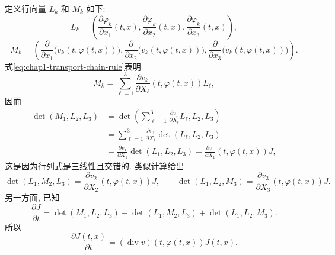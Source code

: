 \begin{Proof}
定义行向量 $L_k$ 和 $M_k$ 如下:
\[
  L_k=\left(
  \frac{\partial\varphi_k}{\partial x_1}(t,x),
  \frac{\partial\varphi_k}{\partial x_2}(t,x),
  \frac{\partial\varphi_k}{\partial x_3}(t,x)
  \right),
\]
\[
  M_k=\left(
  \frac{\partial}{\partial x_1}\bigl(v_k(t,\varphi(t,x))\bigr),
  \frac{\partial}{\partial x_2}\bigl(v_k(t,\varphi(t,x))\bigr),
  \frac{\partial}{\partial x_3}\bigl(v_k(t,\varphi(t,x))\bigr)
  \right).
\]
式\eqref{eq:chap1-transport-chain-rule}表明
\[
  M_k=\sum_{\ell=1}^{3}\frac{\partial v_k}{\partial X_\ell}(t,\varphi(t,x))L_\ell,
\]
因而
\begin{align*}
  \det(M_1,L_2,L_3)
  &=\det\left(\sum_{\ell=1}^{3}\frac{\partial v_1}{\partial X_\ell}L_\ell,L_2,L_3\right)\\
  &=\sum_{\ell=1}^{3}\frac{\partial v_1}{\partial X_\ell}\det(L_\ell,L_2,L_3)\\
  &=\frac{\partial v_1}{\partial X_1}\det(L_1,L_2,L_3)
   =\frac{\partial v_1}{\partial X_1}(t,\varphi(t,x))J,
\end{align*}
这是因为行列式是三线性且交错的. 类似计算给出
\[
  \det(L_1,M_2,L_3)=\frac{\partial v_2}{\partial X_2}(t,\varphi(t,x))J,
  \qquad
  \det(L_1,L_2,M_3)=\frac{\partial v_3}{\partial X_3}(t,\varphi(t,x))J.
\]
另一方面, 已知
\[
  \frac{\partial J}{\partial t}
  =\det(M_1,L_2,L_3)+\det(L_1,M_2,L_3)+\det(L_1,L_2,M_3).
\]
所以
\[
  \frac{\partial J(t,x)}{\partial t}
  =(\operatorname{div}v)(t,\varphi(t,x))J(t,x).
\]


\end{Proof}
